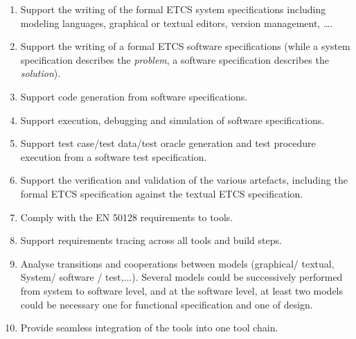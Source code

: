 \documentclass{template/openetcs_article}
\begin{document}
\begin{enumerate}
\item Support the writing of the formal ETCS system
  specifications including modeling languages, graphical or
    textual editors, version management, \dots.

\item Support the writing of a formal ETCS software specifications (while a system specification describes the \emph{problem}, a software specification describes the \emph{solution}).

\item Support code generation from software specifications.

\item Support execution, debugging and simulation of software specifications.

\item Support test case/test data/test oracle generation and test procedure
execution from a software test specification.

\item Support the verification and validation of the various artefacts, including the formal ETCS specification against the textual ETCS specification.


\item Comply with the EN 50128 requirements to tools.

\item Support requirements tracing across all tools and build steps.

\item Analyse transitions and cooperations between models (graphical/ textual, System/ software / test,...). Several models could be successively performed from system to software level, and at the software level, at least two models could be necessary one for functional specification and one of design.

\item Provide seamless integration of the tools into one tool chain. 
 
\end{enumerate}
\end{document}

